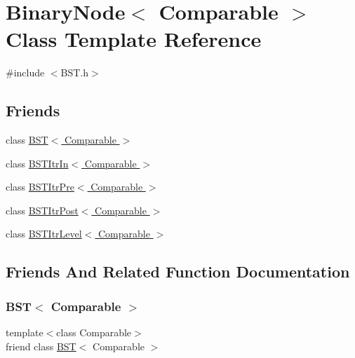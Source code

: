 \hypertarget{class_binary_node}{}\section{Binary\+Node$<$ Comparable $>$ Class Template Reference}
\label{class_binary_node}


{\ttfamily \#include $<$B\+S\+T.\+h$>$}

\subsection*{Friends}
\begin{DoxyCompactItemize}
\item 
class \hyperlink{class_binary_node_a28a1adb9906f3ff7e12c2cb6fa2bd54e}{B\+S\+T$<$ Comparable $>$}
\item 
class \hyperlink{class_binary_node_aab3993acac2ab24a0b59edb0c3acc775}{B\+S\+T\+Itr\+In$<$ Comparable $>$}
\item 
class \hyperlink{class_binary_node_a45a55df6f11541416d4ea7684c575c1a}{B\+S\+T\+Itr\+Pre$<$ Comparable $>$}
\item 
class \hyperlink{class_binary_node_a5dc153694be266f6e772659486219da7}{B\+S\+T\+Itr\+Post$<$ Comparable $>$}
\item 
class \hyperlink{class_binary_node_a26ff00bc0d87069aed877f10fd3c80a8}{B\+S\+T\+Itr\+Level$<$ Comparable $>$}
\end{DoxyCompactItemize}


\subsection{Friends And Related Function Documentation}
\mbox{\label{class_binary_node_a28a1adb9906f3ff7e12c2cb6fa2bd54e}} 
\subsubsection{\texorpdfstring{B\+S\+T$<$ Comparable $>$}{BST< Comparable >}}
{\footnotesize\ttfamily template$<$class Comparable$>$ \\
friend class \hyperlink{class_b_s_t}{B\+ST}$<$ Comparable $>$\hspace{0.3cm}{\ttfamily [friend]}}


